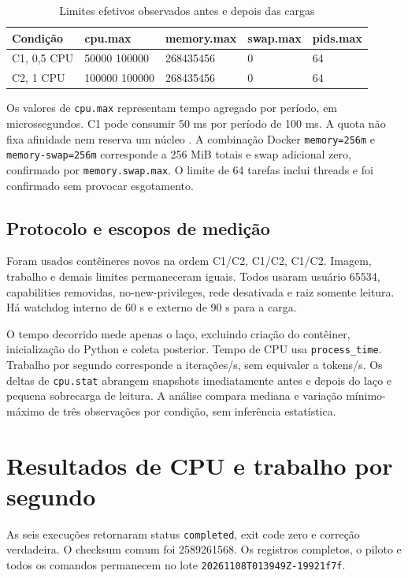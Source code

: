 \documentclass[12pt,a4paper]{article}
\newcommand{\secao}[1]{\clearpage\section{#1}}
\newcommand{\lotecoleta}{\texttt{20261108T013949Z-19921f7f}}
\begin{document}
\begin{table}[H]\centering
\caption{Limites efetivos observados antes e depois das cargas}\label{tab:limites}
\begin{singlespace}\small
\begin{tabularx}{\textwidth}{Xllll}
\toprule\textbf{Condição} & \textbf{cpu.max} & \textbf{memory.max} & \textbf{swap.max} & \textbf{pids.max}\\\midrule
C1, 0,5 CPU & 50000 100000 & 268435456 & 0 & 64\\
C2, 1 CPU & 100000 100000 & 268435456 & 0 & 64\\\bottomrule
\end{tabularx}\end{singlespace}
\par\smallskip{}
\end{table}
Os valores de \texttt{cpu.max} representam tempo agregado por período, em microssegundos. C1 pode consumir 50 ms por período de 100 ms. A quota não fixa afinidade nem reserva um núcleo \cite{cgroups,docker}. A combinação Docker \texttt{memory=256m} e \texttt{memory-swap=256m} corresponde a 256 MiB totais e swap adicional zero, confirmado por \texttt{memory.swap.max}. O limite de 64 tarefas inclui threads e foi confirmado sem provocar esgotamento.

\subsection{Protocolo e escopos de medição}
Foram usados contêineres novos na ordem C1/C2, C1/C2, C1/C2. Imagem, trabalho e demais limites permaneceram iguais. Todos usaram usuário 65534, capabilities removidas, no-new-privileges, rede desativada e raiz somente leitura. Há watchdog interno de 60 s e externo de 90 s para a carga.

O tempo decorrido mede apenas o laço, excluindo criação do contêiner, inicialização do Python e coleta posterior. Tempo de CPU usa \texttt{process\_time}. Trabalho por segundo corresponde a iterações/s, sem equivaler a tokens/s. Os deltas de \texttt{cpu.stat} abrangem snapshots imediatamente antes e depois do laço e pequena sobrecarga de leitura. A análise compara mediana e variação mínimo-máximo de três observações por condição, sem inferência estatística.

\secao{Resultados de CPU e trabalho por segundo}
As seis execuções retornaram status \texttt{completed}, exit code zero e correção verdadeira. O checksum comum foi 2589261568. Os registros completos, o piloto e todos os comandos permanecem no lote \lotecoleta.
\end{document}
